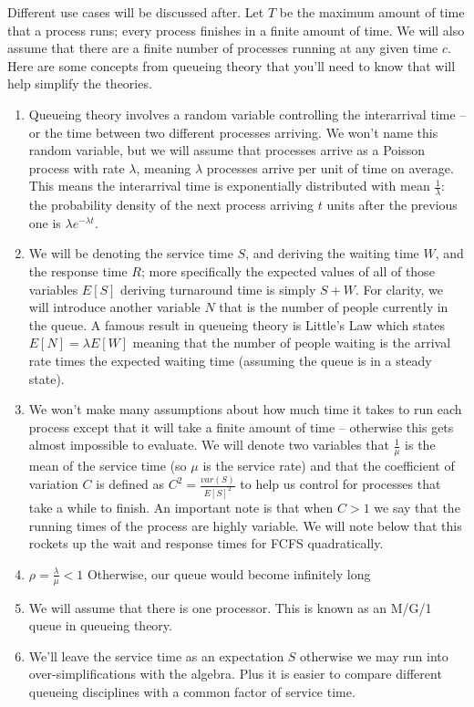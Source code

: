 Different use cases will be discussed after.
Let $T$ be the maximum amount of time that a process runs; every process finishes in a finite amount of time.
We will also assume that there are a finite number of processes running at any given time $c$.
Here are some concepts from queueing theory that you'll need to know that will help simplify the theories.

\begin{enumerate}
\item Queueing theory involves a random variable controlling the interarrival time -- or the time between two different processes arriving.
  We won't name this random variable, but we will assume that processes arrive as a Poisson process with rate $\lambda$, meaning $\lambda$ processes arrive per unit of time on average.
  This means the interarrival time is exponentially distributed with mean $\frac{1}{\lambda}$: the probability density of the next process arriving $t$ units after the previous one is $\lambda e^{-\lambda t}$.
\item We will be denoting the service time $S$, and deriving the waiting time $W$, and the response time $R$; more specifically the expected values of all of those variables $E[S]$ deriving turnaround time is simply $S + W$.
  For clarity, we will introduce another variable $N$ that is the number of people currently in the queue.
  A famous result in queueing theory is Little's Law which states $E[N] = \lambda E[W]$ meaning that the number of people waiting is the arrival rate times the expected waiting time (assuming the queue is in a steady state).
\item We won't make many assumptions about how much time it takes to run each process except that it will take a finite amount of time -- otherwise this gets almost impossible to evaluate.
We will denote two variables that $\frac{1}{\mu}$ is the mean of the service time (so $\mu$ is the service rate) and that the coefficient of variation $C$ is defined as $C^2 = \frac{var(S)}{E[S]^2}$ to help us control for processes that take a while to finish.
An important note is that when $C > 1$ we say that the running times of the process are highly variable. We will note below that this rockets up the wait and response times for FCFS quadratically.
\item $\rho = \frac{\lambda}{\mu} < 1$ Otherwise, our queue would become infinitely long
\item We will assume that there is one processor. This is known as an M/G/1 queue in queueing theory.
\item We'll leave the service time as an expectation $S$ otherwise we may run into over-simplifications with the algebra.
  Plus it is easier to compare different queueing disciplines with a common factor of service time.
\end{enumerate}

